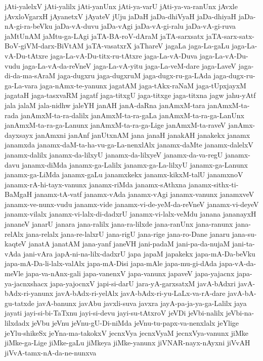 {jAti-yalelxV
jAti-yalilx
jAti-yanUnx
jAti-ya-varU
jAti-ya-va-ranUnx
jAvxle
jAvxloVgarxH
jAyanetxV
jAyateV
jUju
jaDaH
jaDa-dhiVyaH
jaDa-dhiyaH
jaDa-nA-gi-ra-beVku
jaDa-vA-duvu
jaDa-vAgi
jaDa-vA-gi-ralu
jaDa-vA-gi-ruva
jaMtUnAM
jaMtu-ga-LAgi
jaTA-BA-roV-dAraM
jaTA-sarxsatx
jaTA-sarx-satx-BoV-giVM-darx-BiVtAM
jaTA-vasatxrX
jaThareV
jagaLa
jaga-La-gaLu
jaga-La-vA-Du-tAtxre
jaga-La-vA-Du-titx-ru-tAtxre
jaga-La-vA-Duva
jaga-La-vA-Du-vudu
jaga-La-vA-da-reVneV
jaga-La-vA-yitu
jaga-La-veM-dare
jaga-LaveV
jaga-di-da-ma-sAraM
jaga-dugxru
jaga-dugxruM
jaga-dugx-ru-ga-LAda
jaga-dugx-ru-ga-La-vara
jaga-nAmx-te-yanunx
jagatAM
jaga-tAkx-raNaM
jaga-tUpxjayxM
jagataH
jaga-tasxvaRM
jagatf
jaga-titxgU
jaga-titxge
jaga-titxna
jagw
jahu-yAtf
jala
jalaM
jala-nidhw
jaleYH
janAH
janA-daRna
janAmxM-tara
janAmxM-ta-rada
janAmxM-ta-ra-dalilx
janAmxM-ta-ra-gaLa
janAmxM-ta-ra-ga-LanUnx
janAmxM-ta-ra-ga-Lanunx
janAmxM-ta-ra-ga-Lige
janAmxM-ta-raveV
janAmx-dayxsayx
janAmxni
janAnf
janUtxnAM
jana
janaH
janakAH
janakekx
janamx
janamxda
janamx-daM-ta-ha-vu-ga-La-nenxlAlx
janamx-daMte
janamx-dalelxV
janamx-dalilx
janamx-da-lilxyU
janamx-da-lilxyeV
janamx-da-va-regU
janamx-davu
janamx-diMda
janamx-ga-Lalilx
janamx-ga-La-lilxyU
janamx-ga-Lanunx
janamx-ga-LiMda
janamx-gaLu
janamxkekx
janamx-kikxM-talU
janamxnoV
janamx-rA-hi-tayx-vanunx
janamx-riMda
janamx-sAthxna
janamx-sithx-ti-BaMgaH
janamx-tA-vatf
janamx-vAda
janamx-vAgi
janamx-vanunx
janamxveV
janamx-ve-nunx-vudu
janamx-vide
janamx-vi-de-yeM-da-reVneV
janamx-vi-deyeV
janamx-vilalx
janamx-vi-lalx-di-dadxrU
janamx-vi-lalx-veMdu
janana
jananayxH
jananeV
janarU
janara
jana-ralilx
jana-ra-lilxde
jana-ranUnx
jana-ranunx
jana-relAlx
jana-relalx
jana-re-lalxrU
jana-rigU
jana-rige
jana-ro-Dane
janaru
jana-su-kaqteV
janatA
janatAM
jana-yanf
janeVH
jani-padaM
jani-pa-da-nujaM
jani-ta-vAda
jani-vAra
japA-ni-na-lilx-dadxrU
japa
japaM
japakekx
japa-mA-Da-beVku
japa-mA-Da-li-lalx-valAlx
japa-mA-Disi
japa-mAle
japa-mu-gi-dAda
japa-vA-da-meVle
japa-va-nAnx-gali
japa-vanenxV
japa-vanunx
japaveV
japa-yajacnx
japa-ya-jacnxshacx
japa-yajocnxV
japi-si-darU
jara-yA-garxsatxM
javA-bAdxri
javA-bAdx-ri-yanunx
javA-bAdx-ri-yelAlx
javA-bAdx-ri-yu-LaLx-va-rA-dare
javA-bA-gu-tatxde
javA-banunx
javAbu
javxli-suva
javxra
jayA-pa-ja-ya-ga-Lalilx
jaya
jayati
jayi-si-bi-TaTxnu
jayi-si-devu
jayi-su-tAtxroV
jeVDi
jeVbi-nalilx
jeVbi-na-lilxdadx
jeVbu
jeVnu
jeVnu-gU-Di-niMda
jeVnu-tu-papx-va-nenxlalx
jeYlige
jeYlu-shikeSx
jeYna-ma-takokxV
jecnxVya
jecnxVyaM
jecnxVya-vanunx
jiMke
jiMke-ga-Lige
jiMke-gaLu
jiMkeya
jiMke-yanunx
jiVNAR-nayx-nAyxni
jiVvAH
jiVvA-tamx-nA-da-ne-nunxva
}
